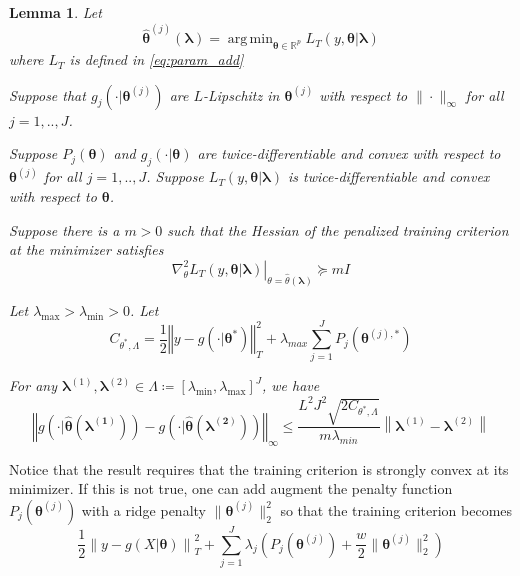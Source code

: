 \documentclass[12pt]{article}
\newtheorem{lemma}{Lemma}
\DeclareMathOperator*{\argmin}{arg\,min}
\begin{document}
\begin{lemma}
	\label{lemma:param_add}
	Let 
	\begin{equation}
	\label{eq:param_add_estimator}
	\hat{\boldsymbol{\theta}}^{(j)}\left (\boldsymbol{\lambda}\right )  = 
	\argmin_{\boldsymbol{\theta} \in \mathbb{R}^p} L_T \left (y, \boldsymbol{\theta} | \boldsymbol{\lambda} \right )
	\end{equation}
	where $L_T$ is defined in \eqref{eq:param_add}
	
	Suppose that $g_j(\cdot| \boldsymbol{\theta}^{(j)})$ are $L$-Lipschitz in $\boldsymbol{\theta}^{(j)}$ with respect to $\| \cdot \|_\infty$ for all $j=1,..,J$.
	
	Suppose $P_j(\boldsymbol{\theta})$ and $g_j(\cdot| \boldsymbol{\theta})$ are twice-differentiable and convex with respect to $\boldsymbol{\theta}^{(j)}$ for all $j=1,..,J$. Suppose $L_T\left (y, \boldsymbol{\theta} | \boldsymbol{\lambda} \right )$ is twice-differentiable and convex with respect to $\boldsymbol{\theta}$.
	
	Suppose there is a $m > 0$ such that the Hessian of the penalized training criterion at the minimizer satisfies 
	\begin{equation}
	\left . \nabla_{\theta}^2 L_T(y, \boldsymbol{\theta} | \boldsymbol{\lambda}) \right |_{\theta = \hat{\theta}(\boldsymbol{\lambda})} \succeq mI
	\end{equation}
	
	Let $\lambda_{\max} > \lambda_{\min} > 0 $. Let
	\begin{equation}
	C_{\theta^{*},\Lambda}=
	\frac{1}{2}\left\Vert y- g(\cdot|\boldsymbol{\theta}^{*})\right\Vert _{T}^{2}
	+\lambda_{max}\sum_{j=1}^{J} P_{j}(\boldsymbol{\theta}^{(j),*})
	\end{equation}
	
	For any $\boldsymbol{\lambda}^{(1)}, \boldsymbol{\lambda}^{(2)} \in \Lambda \coloneqq \left [ \lambda_{\min}, \lambda_{\max} \right ]^J$, we have
	\begin{equation}
	\label{eq:param_add_lipschitz}
	\left\Vert g\left(\cdot|\hat{\boldsymbol{\theta}}(\boldsymbol{\lambda^{(1)}})\right)-g\left(\cdot|\hat{\boldsymbol{\theta}}(\boldsymbol{\lambda^{(2)}})\right)\right\Vert _{\infty}
	\le
	\frac{L^{2}J^{2}\sqrt{2C_{\theta^{*},\Lambda}}}{m \lambda_{min}}
	\left \|\boldsymbol{\lambda}^{(1)}-\boldsymbol{\lambda}^{(2)} \right \|
	\end{equation}
\end{lemma}

Notice that the result requires that the training criterion is strongly convex at its minimizer. If this is not true, one can add augment the penalty function $P_j(\boldsymbol{\theta}^{(j)})$ with a ridge penalty $\| \boldsymbol{\theta}^{(j)} \|_2^2$ so that the training criterion becomes
\begin{equation}
\label{eq:param_add_models_ridge}
\frac{1}{2} \left  \| y -  g(X| \boldsymbol{\theta}) \right \|^2_T 
+ \sum_{j=1}^J \lambda_j \left ( P_j(\boldsymbol{\theta}^{(j)}) + \frac{w}{2} \| \boldsymbol{\theta}^{(j)} \|^2_2 \right )
\end{equation}
\end{document}
